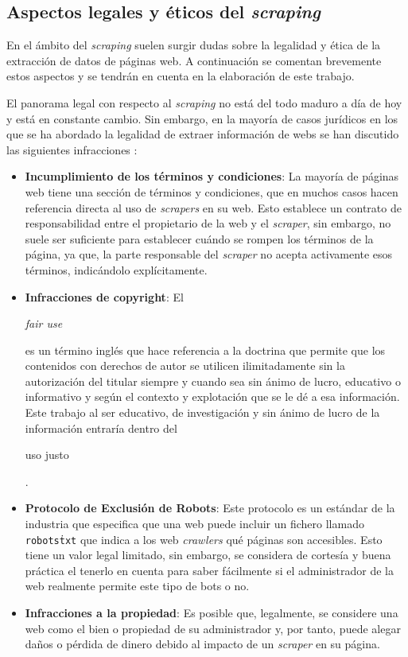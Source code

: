 \subsection{Aspectos legales y éticos del \textit{scraping}} 

En el ámbito del \textit{scraping} suelen surgir dudas sobre la legalidad y
ética de la extracción de datos de páginas web. A continuación se comentan
brevemente estos aspectos y se tendrán en cuenta en la elaboración de este
trabajo.

El panorama legal con respecto al \textit{scraping} no está del todo maduro a
día de hoy y está en constante cambio. Sin embargo, en la mayoría de casos
jurídicos en los que se ha abordado la legalidad de extraer información de webs
se han discutido las siguientes infracciones \cite{apress2018scraping}:

\begin{itemize}
    \item \textbf{Incumplimiento de los términos y condiciones}: La mayoría de
    páginas web tiene una sección de términos y condiciones, que en muchos casos
    hacen referencia directa al uso de \textit{scrapers} en su web. Esto
    establece un contrato de responsabilidad entre el propietario de la web y el
    \textit{scraper}, sin embargo, no suele ser suficiente para establecer
    cuándo se rompen los términos de la página, ya que, la parte responsable del
    \textit{scraper} no acepta activamente esos términos, indicándolo
    explícitamente.
    \item \textbf{Infracciones de copyright}: El
    \begin{otherlanguage}{english}\textit{fair use}\end{otherlanguage} es un
    término inglés que hace referencia a la doctrina que permite que los
    contenidos con derechos de autor se utilicen ilimitadamente sin la
    autorización del titular siempre y cuando sea sin ánimo de lucro, educativo
    o informativo y según el contexto y explotación que se le dé a esa
    información. Este trabajo al ser educativo, de investigación y sin ánimo de
    lucro de la información entraría dentro del
    \begin{otherlanguage}{english}uso justo\end{otherlanguage} .
    \item \textbf{Protocolo de Exclusión de Robots}: Este protocolo es un
    estándar de la industria que especifica que una web puede incluir un fichero
    llamado \texttt{robots\.txt} que indica a los web \textit{crawlers} qué
    páginas son accesibles. Esto tiene un valor legal limitado, sin embargo, se
    considera de cortesía y buena práctica el tenerlo en cuenta para saber
    fácilmente si el administrador de la web realmente permite este tipo de bots
    o no.
    \item \textbf{Infracciones a la propiedad}: Es posible que, legalmente, se
    considere una web como el bien o propiedad de su administrador y, por tanto,
    puede alegar daños o pérdida de dinero debido al impacto de un
    \textit{scraper} en su página.
\end{itemize}

